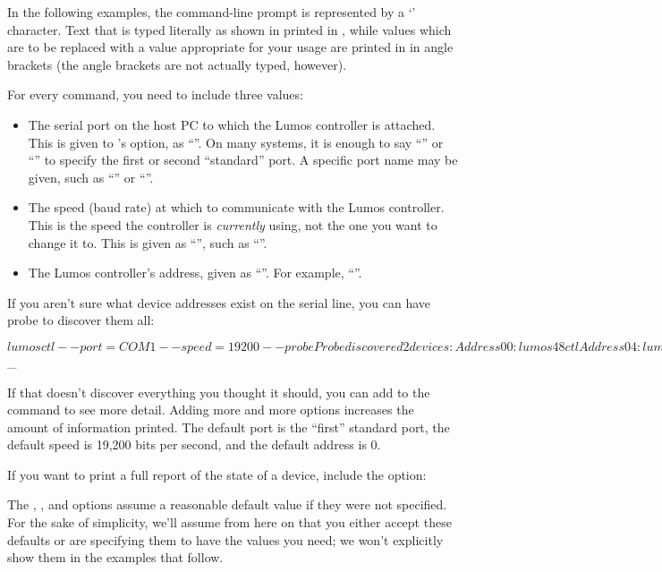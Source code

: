 \documentclass[letterpaper,twoside,onecolumn,openright,final]{memoir}
\begin{document}
In the following examples, the command-line prompt is represented by a `\z{\$}' character.
Text that is typed literally as shown in printed in , while values which are
to be replaced with a value appropriate for your usage are printed in  in angle brackets
(the angle brackets are not actually typed, however).

For every command, you need to include three values:
\begin{itemize}
	\item 	The serial port on the host PC to which the Lumos controller is attached.  This is
		given to 's  option, as ``''.  On many
		systems, it is enough to say ``'' or ``'' to specify the first
		or second ``standard'' port.  A specific port name may be given, such as 
		``'' or ``''.
	\item	The speed (baud rate) at which to communicate with the Lumos controller.  This is
		the speed the controller is \emph{currently} using, not the one you want to change it
		to.  This is given as ``'', such as ``''.
	\item	The Lumos controller's address, given as ``''.  For example,
		``''.
\end{itemize}

If you aren't sure what device addresses exist on the serial line, you can have  
probe to discover them all:
\begin{SourceCode}
$ lumosctl --port=COM1 --speed=19200 --probe
Probe discovered 2 devices:
Address 00: lumos48ctl
Address 04: lumos24dc
$ _
\end{SourceCode}

If that doesn't discover everything you thought it should, you can add  to the command
to see more detail.  Adding more and more  options increases the amount of information
printed.  The default port is the ``first'' standard port, the default speed is 19,200 bits per second,
and the default address is 0.

If you want to print a full report of the state of a device, include the  option:

The , , and  options assume a reasonable default value if
they were not specified.  For the sake of simplicity, we'll assume from here on that you either
accept these defaults or are specifying them to have the values you need; we won't explicitly
show them in the examples that follow.
\end{document}
